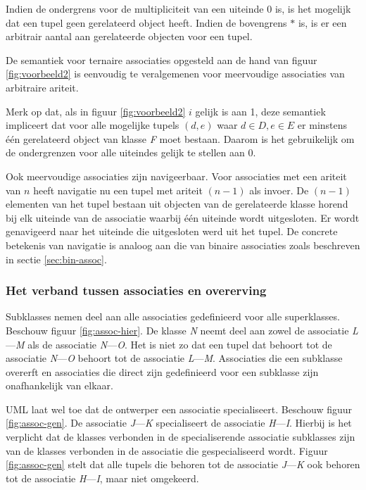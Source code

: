Indien de ondergrens voor de multipliciteit van een uiteinde $0$ is, is het mogelijk dat een tupel geen gerelateerd object heeft. Indien de bovengrens $*$ is, is er een arbitrair aantal aan gerelateerde objecten voor een tupel.

De semantiek voor ternaire associaties opgesteld aan de hand van figuur \ref{fig:voorbeeld2} is eenvoudig te veralgemenen voor meervoudige associaties van arbitraire ariteit.

Merk op dat, als in figuur \ref{fig:voorbeeld2} $i$ gelijk is aan 1, deze semantiek impliceert dat voor alle mogelijke tupels $(d,e)$ waar $d \in D, e \in E$ er minstens \'e\'en gerelateerd object van klasse \textit{F} moet bestaan. Daarom is het gebruikelijk om de ondergrenzen voor alle uiteindes gelijk te stellen aan 0.

Ook meervoudige associaties zijn navigeerbaar. Voor associaties met een ariteit van $n$ heeft navigatie nu een tupel met ariteit $(n-1)$ als invoer. De $(n-1)$ elementen van het tupel bestaan uit objecten van de gerelateerde klasse horend bij elk uiteinde van de associatie waarbij \'e\'en uiteinde wordt uitgesloten. Er wordt genavigeerd naar het uiteinde die uitgesloten werd uit het tupel. De concrete betekenis van navigatie is analoog aan die van binaire associaties zoals beschreven in sectie \ref{sec:bin-assoc}.

\subsubsection{Het verband tussen associaties en overerving}

Subklasses nemen deel aan alle associaties gedefinieerd voor alle superklasses. Beschouw figuur \ref{fig:assoc-hier}. De klasse \textit{N} neemt deel aan zowel de associatie \textit{L}---\textit{M} als de associatie \textit{N}---\textit{O}. Het is niet zo dat een tupel dat behoort tot de associatie \textit{N}---\textit{O} behoort tot de associatie \textit{L}---\textit{M}. Associaties die een subklasse overerft en associaties die direct zijn gedefinieerd voor een subklasse zijn onafhankelijk van elkaar.

UML laat wel toe dat de ontwerper een associatie specialiseert\cite{RumbaughJames2005Tuml}. Beschouw figuur \ref{fig:assoc-gen}. De associatie \textit{J}---\textit{K} specialiseert de associatie \textit{H}---\textit{I}. Hierbij is het verplicht dat de klasses verbonden in de specialiserende associatie subklasses zijn van de klasses verbonden in de associatie die gespecialiseerd wordt. Figuur \ref{fig:assoc-gen} stelt dat alle tupels die behoren tot de associatie \textit{J}---\textit{K} ook behoren tot de associatie \textit{H}---\textit{I}, maar niet omgekeerd.

